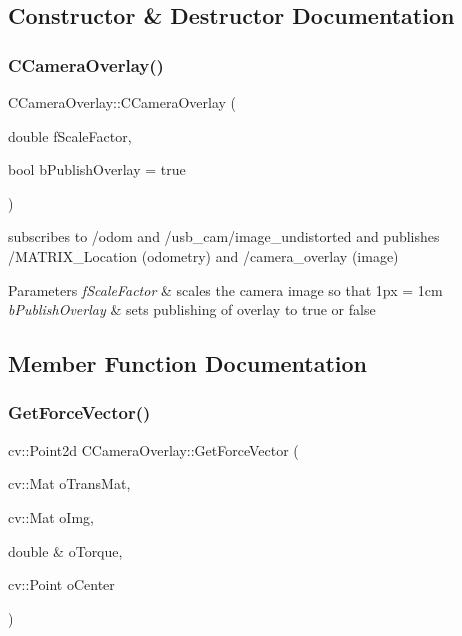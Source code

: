 \subsection{Constructor \& Destructor Documentation}
\mbox{\label{classCCameraOverlay_af3bb4a64b788a48193a5bcf32ec9c48e}} 
\subsubsection{\texorpdfstring{C\+Camera\+Overlay()}{CCameraOverlay()}}
{\footnotesize\ttfamily C\+Camera\+Overlay\+::\+C\+Camera\+Overlay (\begin{DoxyParamCaption}\item[{double}]{f\+Scale\+Factor,  }\item[{bool}]{b\+Publish\+Overlay = {\ttfamily true} }\end{DoxyParamCaption})\hspace{0.3cm}{\ttfamily [inline]}}

subscribes to /odom and /usb\+\_\+cam/image\+\_\+undistorted and publishes /\+M\+A\+T\+R\+I\+X\+\_\+\+Location (odometry) and /camera\+\_\+overlay (image) 
\begin{DoxyParams}{Parameters}
{\em f\+Scale\+Factor} & scales the camera image so that 1px = 1cm \\
\hline
{\em b\+Publish\+Overlay} & sets publishing of overlay to true or false \\
\hline
\end{DoxyParams}


\subsection{Member Function Documentation}
\mbox{\label{classCCameraOverlay_a36f4f263b03af8e1ceb0ed4c1e254316}} 
\subsubsection{\texorpdfstring{Get\+Force\+Vector()}{GetForceVector()}}
{\footnotesize\ttfamily cv\+::\+Point2d C\+Camera\+Overlay\+::\+Get\+Force\+Vector (\begin{DoxyParamCaption}\item[{cv\+::\+Mat}]{o\+Trans\+Mat,  }\item[{cv\+::\+Mat}]{o\+Img,  }\item[{double \&}]{o\+Torque,  }\item[{cv\+::\+Point}]{o\+Center }\end{DoxyParamCaption})\hspace{0.3cm}{\ttfamily [inline]}}

